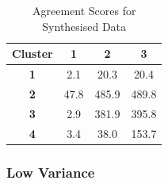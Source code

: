 			\begin{table}[h!]
				\centering
				\begin{tabular}{|c|c|c|c|}
					\hline
					\bf{Cluster} & \bf{1} & \bf{2} & \bf{3} \tabularnewline
					\hline
					\hline
					\bf{1} & 2.1 & 20.3 & 20.4 \tabularnewline
					\hline
					\bf{2} & 47.8 & 485.9 & 489.8 \tabularnewline
					\hline
					\bf{3} & 2.9 & 381.9 & 395.8 \tabularnewline
					\hline
					\bf{4} & 3.4 & 38.0 & 153.7 \tabularnewline
					\hline
				\end{tabular}
				\caption{Agreement Scores for Synthesised Data}
				\label{tab:SynthesisedDataAgreement}
			\end{table}

		\subsubsection*{Low Variance}
